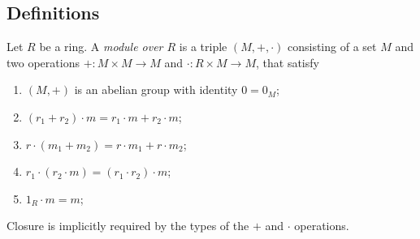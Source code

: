 \subsection{Definitions}
\begin{definition}
	Let \( R \) be a ring.
	A \textit{module over \( R \)} is a triple \( (M, +, \cdot) \) consisting of a set \( M \) and two operations \( + \colon M \times M \to M \) and \( \cdot \colon R \times M \to M \), that satisfy
	\begin{enumerate}
		\item \( (M, +) \) is an abelian group with identity \( 0 = 0_M \);
		\item \( (r_1 + r_2) \cdot m = r_1 \cdot m + r_2 \cdot m \);
		\item \( r \cdot (m_1 + m_2) = r \cdot m_1 + r \cdot m_2 \);
		\item \( r_1 \cdot (r_2 \cdot m) = (r_1 \cdot r_2) \cdot m \);
		\item \( 1_R \cdot m = m \);
	\end{enumerate}
\end{definition}
\begin{remark}
	Closure is implicitly required by the types of the \( + \) and \( \cdot \) operations.
\end{remark}
